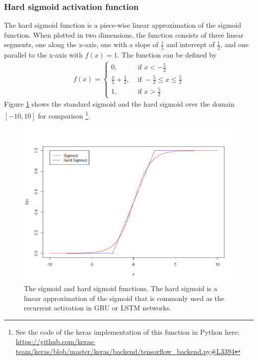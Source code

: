 \documentclass[a4paper,12pt]{article}
\theoremstyle{definition}
\begin{document}
\subsubsection{Hard sigmoid activation function}\label{sec:hard_sigmoid}
The hard sigmoid function is a piece-wise linear approximation of the sigmoid function. When plotted in two dimensions, the function consists of three linear segments, one along the x-axis, one with a slope of $\frac{1}{5}$ and intercept of $\frac{1}{2}$, and one parallel to the x-axis with $f(x) = 1$. The function can be defined by 
\begin{align}
	f(x) = \begin{cases}
		0, &\text{ if } x < -\frac{5}{2} \\
		\frac{x}{5} + \frac{1}{2}, &\text{ if }  -\frac{5}{2} \leq x \leq \frac{5}{2} \\
		1, &\text{ if } x > \frac{5}{2}
	\end{cases}
\end{align}
Figure \ref{fig:sigmoid} shows the standard sigmoid and the hard sigmoid over the domain $[-10, 10]$ for comparison \footnote{See the code of the keras implementation of this function in Python here: \url{https://github.com/keras-team/keras/blob/master/keras/backend/tensorflow\_backend.py\#L3394}}.

\begin{figure}[ht]
	\centering
	\includegraphics[width=\textwidth]{figures/sigmoid.png}
	\caption{The sigmoid and hard sigmoid functions. The hard sigmoid is a linear approximation of the sigmoid that is commonly used as the recurrent activation in GRU or LSTM networks.}
	\label{fig:sigmoid}
\end{figure}
\end{document}
